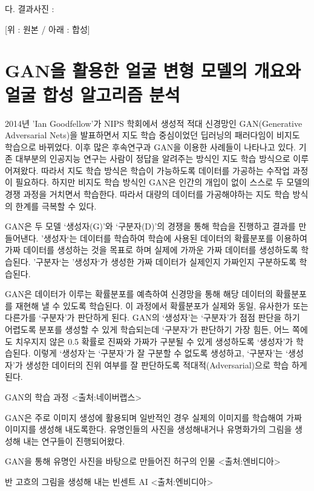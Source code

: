 \documentclass{oblivoir}
\begin{document}
    다. 결과사진 :

[위 : 원본 / 아래 : 합성]


   \section{ GAN을 활용한 얼굴 변형 모델의 개요와 얼굴 합성 알고리즘 분석}

2014년 'Ian Goodfellow'가 NIPS 학회에서 생성적 적대 신경망인 GAN(Generative Adversarial Nets)을 발표하면서 지도 학습 중심이었던 딥러닝의 패러다임이 비지도 학습으로 바뀌었다. 이후 많은 후속연구과 GAN을 이용한 사례들이 나타나고 있다. 기존 대부분의 인공지능 연구는 사람이 정답을 알려주는 방식인 지도 학습 방식으로 이루어져왔다. 따라서 지도 학습 방식은 학습이 가능하도록 데이터를 가공하는 수작업 과정이 필요하다. 하지만 비지도 학습 방식인 GAN은 인간의 개입이 없이 스스로 두 모델의 경쟁 과정을 거치면서 학습한다. 따라서 대량의 데이터를 가공해야하는 지도 학습 방식의 한계를 극복할 수 있다.

GAN은 두 모델 ‘생성자(G)’와 ‘구분자(D)’의 경쟁을 통해 학습을 진행하고 결과를 만들어낸다. '생성자‘는 데이터를 학습하여 학습에 사용된 데이터의 확률분포를 이용하여 가짜 데이터를 생성하는 것을 목표로 하며 실제에 가까운 가짜 데이터를 생성하도록 학습된다. ’구분자‘는 ’생성자‘가 생성한 가짜 데이터가 실제인지 가짜인지 구분하도록 학습된다.

GAN은 데이터가 이루는 확률분포를 예측하여 신경망을 통해 해당 데이터의 확률분포를 재현해 낼 수 있도록 학습된다. 이 과정에서 확률분포가 실제와 동일, 유사한가 또는 다른가를 ‘구분자’가 판단하게 된다. GAN의 ‘생성자’는 ‘구분자’가 점점 판단을 하기 어렵도록 분포를 생성할 수 있게 학습되는데 ‘구분자’가 판단하기 가장 힘든, 어느 쪽에도 치우지지 않은 0.5 확률로 진짜와 가짜가 구분될 수 있게 생성하도록 ‘생성자’가 학습된다. 이렇게 ‘생성자’는 ‘구분자’가 잘 구분할 수 없도록 생성하고, ‘구분자’는 ‘생성자’가 생성한 데이터의 진위 여부를 잘 판단하도록 적대적(Adversarial)으로 학습 하게 된다.

GAN의 학습 과정 <출처:네이버랩스>

GAN은 주로 이미지 생성에 활용되며 일반적인 경우 실제의 이미지를 학습해여 가짜 이미지를 생성해 내도록한다. 유명인들의 사진을 생성해내거나 유명화가의 그림을 생성해 내는 연구들이 진행되어왔다.

GAN을 통해 유명인 사진을 바탕으로 만들어진 허구의 인물 <출처:엔비디아>

반 고흐의 그림을 생성해 내는 빈센트 AI <출처:엔비디아>
\end{document}
